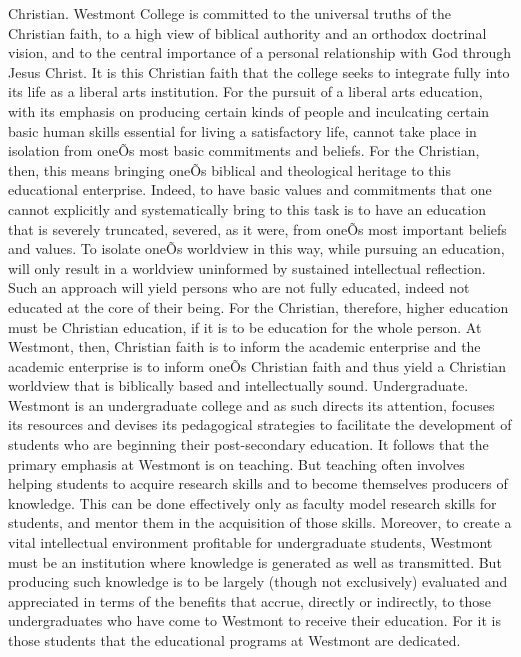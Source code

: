\documentclass[letterpaper, 11pt]{article}
\begin{document}
   Christian.  Westmont College is committed to the universal truths of the Christian faith, to a high view of biblical authority and an orthodox doctrinal vision, and to the central importance of a personal relationship with God through Jesus Christ.  It is this Christian faith that the college seeks to integrate fully into its life as a liberal arts institution.  For the pursuit of a liberal arts education, with its emphasis on producing certain kinds of people and inculcating certain basic human skills essential for living a satisfactory life, cannot take place in isolation from oneÕs most basic commitments and beliefs.  For the Christian, then, this means bringing oneÕs biblical and theological heritage to this educational enterprise. Indeed, to have basic values and commitments that one cannot explicitly and systematically bring to this task is to have an education that is severely truncated, severed, as it were, from oneÕs most important beliefs and values.  To isolate oneÕs worldview in this way, while pursuing an education, will only result in a worldview uninformed by sustained intellectual reflection.  Such an approach will yield persons who are not fully educated, indeed not educated at the core of their being.  For the Christian, therefore, higher education must be Christian education, if it is to be education for the whole person.  At Westmont, then, Christian faith is to inform the academic enterprise and the academic enterprise is to inform oneÕs Christian faith and thus yield a Christian worldview that is biblically based and intellectually sound. 
   Undergraduate.  Westmont is an undergraduate college and as such directs its attention, focuses its resources and devises its pedagogical strategies to facilitate the development of students who are beginning their post-secondary education.  It follows that the primary emphasis at Westmont is on teaching.  But teaching often involves helping students to acquire research skills and to become themselves producers of knowledge.  This can be done effectively only as faculty model research skills for students, and mentor them in the acquisition of those skills.  Moreover, to create a vital intellectual environment profitable for undergraduate students, Westmont must be an institution where knowledge is generated as well as transmitted.  But producing such knowledge is to be largely (though not exclusively) evaluated and appreciated in terms of the benefits that accrue, directly or indirectly, to those undergraduates who have come to Westmont to receive their education. For it is those students that the educational programs at Westmont are dedicated.
\end{document}
